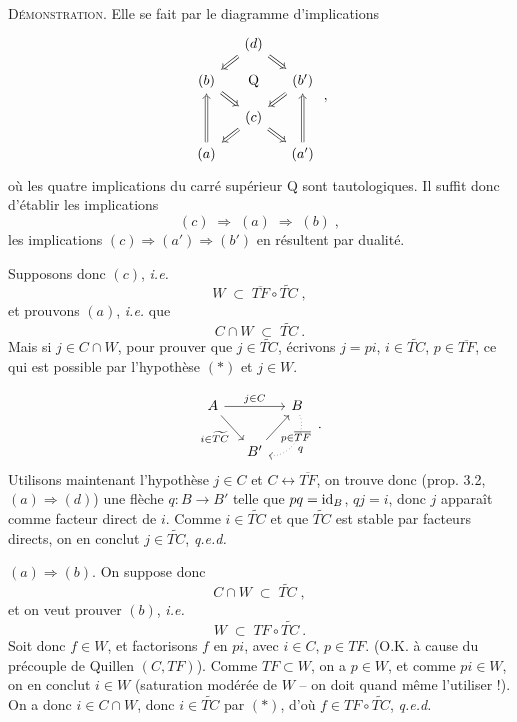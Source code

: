 \textsc{Démonstration}. Elle se fait par le diagramme d'implications
\[
\begin{tikzcd}[column sep=small, row sep=small]
& (d) \arrow[dl, Rightarrow] \arrow[dr, Rightarrow] & \\
(b) \arrow[dr, Rightarrow] & \mathrm{Q} & (b') \arrow[dl, Rightarrow] \\
& (c) \arrow[dl, Rightarrow] \arrow[dr, Rightarrow] & \\
(a) \arrow[uu, Rightarrow] & & (a') \arrow[uu, Rightarrow]
\end{tikzcd}
\;,
\]
où les quatre implications du carré supérieur Q sont tautologiques. Il suffit donc d'établir les implications
\[
(c) \;\Longrightarrow\; (a) \;\Longrightarrow\; (b)\;,
\]
les implications $(c)\Longrightarrow(a')\Longrightarrow(b')$ en résultent par dualité.

Supposons donc $(c)$, \textit{i.e.}
\[
W \;\subset\; \overline{TF}\circ\widetilde{TC}\;,
\tag*{$(*)$}
\]
et prouvons $(a)$, \textit{i.e.} que
\[
C\cap W \;\subset\; \widetilde{TC}\ .
\]
Mais si $j\in C\cap W$, pour prouver que $j\in\widetilde{TC}$, écrivons $j=pi$, $i\in\widetilde{TC}$, $p\in\overline{TF}$, ce qui est possible par l'hypothèse $(*)$ et $j\in W$.

\[
\begin{tikzcd}[column sep=small]
A \arrow[rr, "j\in C"] \arrow[dr, "i\in\widetilde{TC}"'] & & B \arrow[dl, dotted, bend left=60, "q"] \\
& B' \arrow[ur, "p\in\overline{TF}"'] &
\end{tikzcd}
\;.
\]
Utilisons maintenant l'hypothèse $j\in C$ et $C\longleftrightarrow\overline{TF}$, on trouve donc (prop. 3.2, $(a)\Longrightarrow(d)$) une flèche $q:B\longrightarrow B'$ telle que $pq=\mathrm{id}_B$, $qj=i$, donc $j$ apparaît comme facteur direct de $i$. Comme $i\in\widetilde{TC}$ et que $\widetilde{TC}$ est stable par facteurs directs, on en conclut $j\in\widetilde{TC}$, \quad \textit{q.e.d.}

$(a)\Longrightarrow(b)$. On suppose donc
\[
C\cap W \;\subset\; \widetilde{TC}\;,
\tag*{$(*)$}
\]
et on veut prouver $(b)$, \textit{i.e.}
\[
W \;\subset\; TF\circ\widetilde{TC}\ .
\]
Soit donc $f\in W$, et factorisons $f$ en $pi$, avec $i\in C$, $p\in TF$. (O.K. à cause du précouple de Quillen $(C,TF)$). Comme $TF\subset W$, on a $p\in W$, et comme $pi\in W$, on en conclut $i\in W$ (saturation modérée de $W$ -- on doit quand même l'utiliser !). On a donc $i\in C{\cap}W$, donc $i\in\widetilde{TC}$ par $(*)$, d'où $f\in TF\circ\widetilde{TC}$, \quad \textit{q.e.d.}

